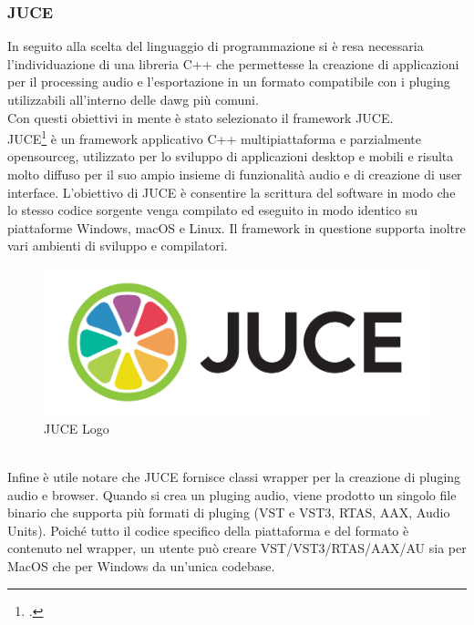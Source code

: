 \subsubsection*{JUCE}
In seguito alla scelta del linguaggio di programmazione si è resa necessaria l'individuazione di una libreria C++ che permettesse la creazione di applicazioni per il processing audio e l'esportazione in un formato compatibile con i \gls{pluging} utilizzabili all'interno delle \gls{dawg} più comuni. \\
Con questi obiettivi in mente è stato selezionato il framework JUCE. \\
JUCE\footcite{site:juce} è un framework applicativo C++ multipiattaforma e parzialmente \gls{opensourceg}, utilizzato per lo sviluppo di applicazioni desktop e mobili e risulta molto diffuso per il suo ampio insieme di funzionalità audio e di creazione di user interface. L'obiettivo di JUCE è consentire la scrittura del software in modo che lo stesso codice sorgente venga compilato ed eseguito in modo identico su piattaforme Windows, macOS e Linux. Il framework in questione supporta inoltre vari ambienti di sviluppo e compilatori.
\begin{figure}[h!] 
    \centering 
    \includegraphics[width=0.6\columnwidth]{immagini/cap3/juce.png}
    \caption{JUCE Logo}
\end{figure} \\
Infine è utile notare che JUCE fornisce classi wrapper per la creazione di \gls{pluging} audio e browser. Quando si crea un \gls{pluging} audio, viene prodotto un singolo file binario che supporta più formati di \gls{pluging} (VST e VST3, RTAS, AAX, Audio Units). Poiché tutto il codice specifico della piattaforma e del formato è contenuto nel wrapper, un utente può creare VST/VST3/RTAS/AAX/AU sia per MacOS che per Windows da un'unica codebase. 

